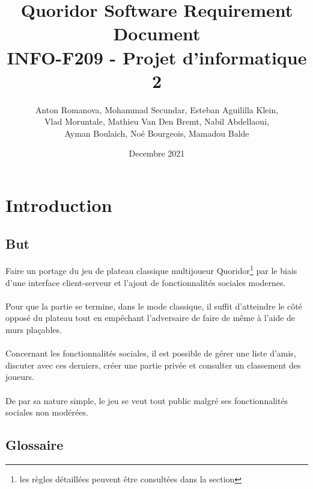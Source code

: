 \documentclass[french, utf8]{article}
\title{Quoridor Software Requirement Document \\
\large INFO-F209 - Projet d'informatique 2}
\author{Anton Romanova, Mohammad Secundar, Esteban Aguililla Klein, \\
Vlad Moruntale, Mathieu Van Den Bremt, Nabil Abdellaoui, \\
Ayman Boulaich, Noé Bourgeois, Mamadou Balde
}
\date{Decembre 2021}
\begin{document}
\maketitle
\tableofcontents
\newpage


\section{Introduction}
\subsection{But}
Faire un portage du jeu de plateau classique multijoueur Quoridor\footnote{les règles détaillées peuvent être consultées dans la section } par le biais d'une interface client-serveur et l'ajout de fonctionnalités sociales modernes.
\\ \\
Pour que la partie se termine, dans le mode classique, il suffit d'atteindre le côté opposé du plateau tout en empêchant l'adversaire de faire de même à l'aide de murs plaçables.    %
\\ \\
Concernant les fonctionnalités sociales, il est possible de gérer une liste d'amis, discuter avec ces derniers, créer une partie privée et consulter un classement des joueurs.
\\ \\
De par sa nature simple, le jeu se veut tout public malgré ses fonctionnalités sociales non modérées.  %

\subsection{Glossaire}
\end{document}
